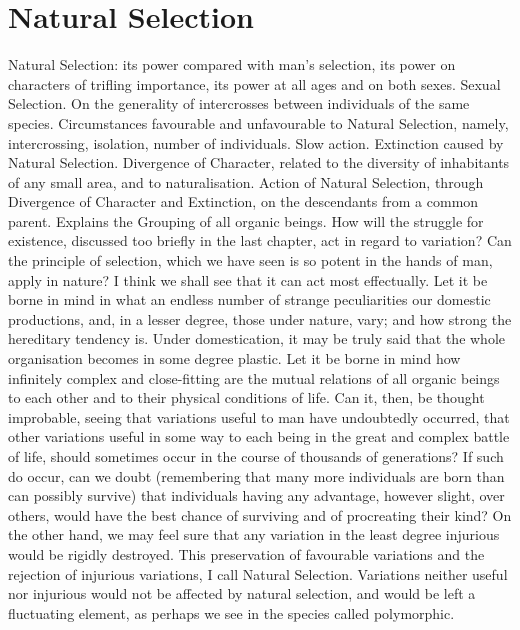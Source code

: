 \chapter{Natural Selection}
Natural Selection: its power compared with man's selection, its power on characters of trifling importance, its power at all ages and on both sexes. Sexual Selection. On the generality of intercrosses between individuals of the same species. Circumstances favourable and unfavourable to Natural Selection, namely, intercrossing, isolation, number of individuals. Slow action. Extinction caused by Natural Selection. Divergence of Character, related to the diversity of inhabitants of any small area, and to naturalisation. Action of Natural Selection, through Divergence of Character and Extinction, on the descendants from a common parent. Explains the Grouping of all organic beings.
How will the struggle for existence, discussed too briefly in the last chapter, act in regard to variation? Can the principle of selection, which we have seen is so potent in the hands of man, apply in nature? I think we shall see that it can act most effectually. Let it be borne in mind in what an endless number of strange peculiarities our domestic productions, and, in a lesser degree, those under nature, vary; and how strong the hereditary tendency is. Under domestication, it may be truly said that the whole organisation becomes in some degree plastic. Let it be borne in mind how infinitely complex and close-fitting are the mutual relations of all organic beings to each other and to their physical conditions of life. Can it, then, be thought improbable, seeing that variations useful to man have undoubtedly occurred, that other variations useful in some way to each being in the great and complex battle of life, should sometimes occur in the course of thousands of generations? If such do occur, can we doubt (remembering that many more individuals are born than can possibly survive) that individuals having any advantage, however slight, over others, would have the best chance of surviving and of procreating their kind? On the other hand, we may feel sure that any variation in the least degree injurious would be rigidly destroyed. This preservation of favourable variations and the rejection of injurious variations, I call Natural Selection. Variations neither useful nor injurious would not be affected by natural selection, and would be left a fluctuating element, as perhaps we see in the species called polymorphic.
